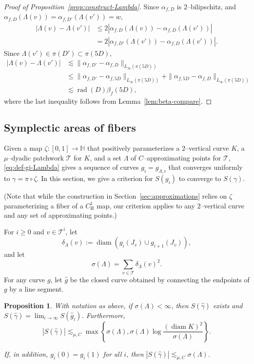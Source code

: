 \documentclass[12pt,reqno]{amsart}
\newcommand{\cT}{\mathcal{T}}
\DeclareMathOperator{\rad}{rad}
\newcommand{\HH}{\mathbb{H}}
\newcommand{\from}{\colon}
\newtheorem{prop}[thm]{Proposition}
\theoremstyle{remark}
\newcommand{\0}{\mathbf{0}}
\renewcommand{\1}{\mathbf 1}
\DeclareMathOperator{\diam}{diam}
\begin{document}
\begin{proof}[Proof of Proposition~\ref{prop:construct-Lambda}]
  Since $\alpha_{f,D}$ is $2$--bilipschitz, and $\alpha_{f,D}(\Lambda(v))=\alpha_{f,D'}(\Lambda(v'))=w$,
  \begin{align*}
    |\Lambda(v) -\Lambda(v')| & \le 2|\alpha_{f,D}(\Lambda(v))-\alpha_{f,D}(\Lambda(v'))| \\
    & = 2 |\alpha_{f,D'}(\Lambda(v'))-\alpha_{f,D}(\Lambda(v'))|.
  \end{align*}
  Since $\Lambda(v') \in \pi(D') \subset \pi(5D)$,
  \begin{align*}
    |\Lambda(v) -\Lambda(v')| & \lesssim \|\alpha_{f,D'} - \alpha_{f,D}\|_{L_\infty(\pi(5D))} \\
    & \le \|\alpha_{f,D'} - \alpha_{f,5D}\|_{L_\infty(\pi(5D))} + \|\alpha_{f,5D} - \alpha_{f,D}\|_{L_\infty(\pi(5D))} \\
    & \lesssim \rad(D)\beta_f(5D),
  \end{align*}
  where the last inequality follows from Lemma~\ref{lem:beta-compare}.
\end{proof}

\subsection{Symplectic areas of fibers}\label{sec:symplectic-area}
Given a map $\zeta\from [0,1]\to \HH$ that positively parameterizes a $2$--vertical curve $K$, a $\mu$--dyadic patchwork $\cT$ for $K$, and a set $\Lambda$ of $C$--approximating points for $\cT$, \eqref{eq:def-gi-Lambda} gives a sequence of curves $g_i=g_{\Lambda,i}$ that converges uniformly to $\gamma = \pi\circ \zeta$. In this section, we give a criterion for $S(g_i)$ to converge to $S(\gamma)$. 

(Note that while the construction in Section~\ref{sec:approximations} relies on $\zeta$ parameterizing a fiber of a $C^1_{\mathrm{H}}$ map, our criterion applies to any $2$--vertical curve and any set of approximating points.)

For $i\ge 0$ and $v\in \cT^i$, let
\begin{equation}\label{eq:def-delta-lambda}
  \delta_\Lambda(v) := \diam(g_{i}(J_v) \cup g_{i+1}(J_v)),
\end{equation}
and let
\begin{equation}\label{eq:def-sigma-lambda}
  \sigma(\Lambda) = \sum_{v\in \cT} \delta_\Lambda(v)^2.
\end{equation}
For any curve $g$, let $\hat{g}$ be the closed curve obtained by connecting the endpoints of $g$ by a line segment. 
\begin{prop}\label{prop:vertical-curve-area}
  With notation as above, if $\sigma(\Lambda)<\infty$, then
  $S(\hat{\gamma})$ exists and 
  $S(\hat{\gamma}) = \lim_{i\to \infty} S(\hat{g}_i)$. Furthermore, 
  \begin{equation}\label{eq:sgamma-bound}
    |S(\hat{\gamma})| \lesssim_{\mu,C} \max\left\{\sigma(\Lambda), \sigma(\Lambda) \log \frac{(\diam K)^2}{\sigma(\Lambda)}\right\}.
  \end{equation}
  
  If, in addition, $g_i(0)=g_i(1)$ for all $i$, then $|S(\hat{\gamma})| \lesssim_{\mu,C} \sigma(\Lambda)$.
\end{prop}
\end{document}
